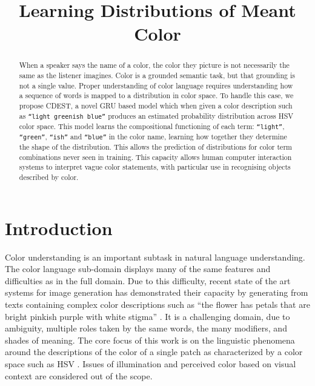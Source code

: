 \documentclass[11pt,letterpaper]{article}
\title{Learning Distributions of Meant Color}
\author{}
\date{}
\newcommand{\parencite}{\cite}
\begin{document}
\maketitle

\begin{abstract}
When a speaker says the name of a color, the color they picture is not necessarily the same as the listener imagines.
Color is a grounded semantic task, but that grounding is not a single value.
Proper understanding of color language requires understanding how a sequence of words is mapped to a distribution in color space.
To handle this case, we propose CDEST, a novel GRU based model which when given a color description such as \texttt{``light greenish blue''} produces an estimated probability distribution across HSV color space.
This model learns the compositional functioning of each term: \texttt{``light''}, \texttt{``green''}, \texttt{``ish''} and \texttt{``blue''} in the color name, learning how together they determine the shape of the distribution.
This allows the prediction of  distributions for color term combinations never seen in training.
This capacity allows human computer interaction systems to interpret vague color statements, with particular use in recognising objects described by color.
\end{abstract}

\section{Introduction}

Color understanding is an important subtask in natural language understanding.
The color language sub-domain displays many of the same features and difficulties as in the full domain.
Due to this difficulty, recent state of the art systems for image generation has demonstrated their capacity by generating from texts containing complex color descriptions such as ``the flower has petals that are bright pinkish purple with white stigma'' \parencite{reed2016generative, 2015arXiv151102793M}.
It is a challenging domain, due to ambiguity, multiple roles taken by the same words, the many modifiers, and shades of meaning.
The core focus of this work is on the linguistic phenomena around the descriptions of the color of a single patch as characterized by a color space such as HSV \parencite{smith1978color}.
Issues of illumination and perceived color based on visual context are considered out of the scope.
\end{document}
